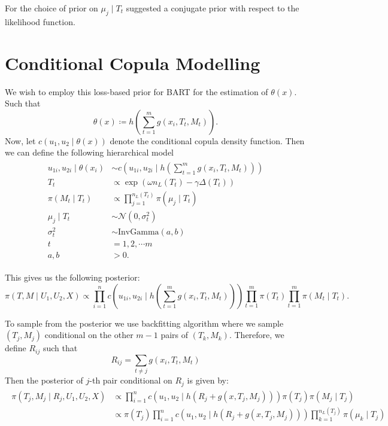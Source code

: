 \documentclass{amsart}
\begin{document}
For the choice of prior on $\mu_j\mid T_t$ \citet{chipman_BART,serafini2024lossbasedpriortreetopologies} suggested a conjugate prior with respect to the likelihood function. 

\section{Conditional Copula Modelling}\label{sec:cond:cop}

We wish to employ this loss-based prior for BART for the estimation of $\theta(x)$. Such that 
\begin{equation*}
	\theta(x) \coloneqq h\left(\sum_{t=1}^m g(x_i, T_t, M_t)\right).
\end{equation*}
Now, let $c\left(u_1,u_2\mid \theta(x)\right)$ denote the conditional copula density function. Then we can define the following hierarchical model
\begin{align}
	\begin{split}
		u_{1i},u_{2i} \mid \theta(x_i) & \sim c\left(u_{1i},u_{2i}\mid h\left(\sum_{t=1}^m g(x_i, T_t, M_t)\right)\right)\\
		T_t &\propto \exp\left(\omega n_L(T_t)-\gamma\Delta(T_t)\right)\\
		\pi(M_t\mid T_t) &\propto \prod_{j=1}^{n_L(T_t)}\pi(\mu_j\mid T_t)\\
		\mu_j\mid T_t &\sim \mathcal{N}(0,\sigma_{t}^2)\\
		\sigma_{t}^2&\sim \text{InvGamma}(a,b)\\
		t & = 1,2,\cdots m\\
		a,b&>0.
	\end{split}
\end{align}

This gives us the following posterior:
\begin{equation}
	\pi(T,M \mid U_1, U_2, X) \propto \prod_{i=1}^{n}c\left(u_{1i},u_{2i}\mid h\left(\sum_{t=1}^m g(x_i, T_t, M_t)\right)\right)\prod_{t=1}^{m}\pi(T_t)\prod_{t=1}^{m}\pi(M_t\mid T_t).
\end{equation}

To sample from the posterior we use backfitting algorithm where we sample $(T_j, M_j)$ conditional on the other $m-1$ pairs of $(T_k,M_k)$. Therefore, we define $R_{ij}$ such that
\begin{equation*}
	R_{ij} = \sum_{t\not=j}g(x_i, T_t, M_t)
\end{equation*}
Then the posterior of $j$-th pair conditional on $R_j$ is given by:
\begin{align}\label{eq:post:res}
	\begin{split}
		\pi(T_j,M_j \mid R_j, U_1,U_2, X) &\propto \prod_{i=1}^{n}c\left(u_{1},u_{2}\mid h\left(R_j+g(x, T_j, M_j)\right)\right)\pi(T_j)\pi(M_j\mid T_j)\\
		&\propto \pi(T_j)\prod_{i=1}^{n}c\left(u_{1},u_{2}\mid h\left(R_j+g(x, T_j, M_j)\right)\right)\prod_{k=1}^{n_L(T_j)}\pi(\mu_k\mid T_j)
	\end{split}
\end{align}
\end{document}
